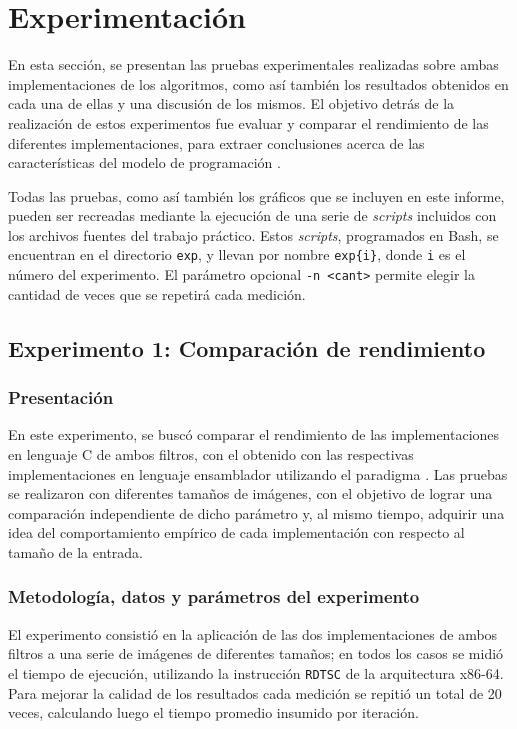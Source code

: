 \section{Experimentación}
    En esta sección, se presentan las pruebas experimentales realizadas sobre ambas implementaciones de los algoritmos, como así también los resultados obtenidos en cada una de ellas y una discusión de los mismos. El objetivo detrás de la realización de estos experimentos fue evaluar y comparar el rendimiento de las diferentes implementaciones, para extraer conclusiones acerca de las características del modelo de programación .

    Todas las pruebas, como así también los gráficos que se incluyen en este informe, pueden ser recreadas mediante la ejecución de una serie de \emph{scripts} incluidos con los archivos fuentes del trabajo práctico. Estos \emph{scripts}, programados en Bash, se encuentran en el directorio \texttt{exp}, y llevan por nombre \texttt{exp\{i\}}, donde \texttt{i} es el número del experimento. El parámetro opcional \texttt{-n <cant>} permite elegir la cantidad de veces que se repetirá cada medición.

    \subsection{Experimento 1: Comparación de rendimiento}

        \subsubsection*{Presentación}
        	En este experimento, se buscó comparar el rendimiento de las implementaciones en lenguaje C de ambos filtros, con el obtenido con las respectivas implementaciones en lenguaje ensamblador utilizando el paradigma . Las pruebas se realizaron con diferentes tamaños de imágenes, con el objetivo de lograr una comparación independiente de dicho parámetro y, al mismo tiempo, adquirir una idea del comportamiento empírico de cada implementación con respecto al tamaño de la entrada.

        \subsubsection*{Metodología, datos y parámetros del experimento}
        	El experimento consistió en la aplicación de las dos implementaciones de ambos filtros a una serie de imágenes de diferentes tamaños; en todos los casos se midió el tiempo de ejecución, utilizando la instrucción \texttt{RDTSC} de la arquitectura x86-64. Para mejorar la calidad de los resultados cada medición se repitió un total de 20 veces, calculando luego el tiempo promedio insumido por iteración.

